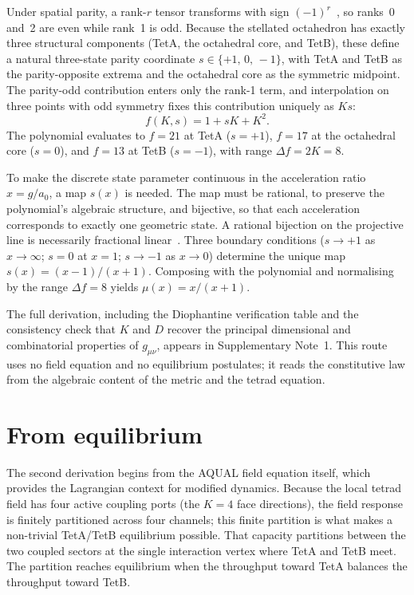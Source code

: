\documentclass[twocolumn]{iopjournal}
\begin{document}
Under spatial parity, a rank-$r$ tensor transforms with sign
$(-1)^r$~\cite{MTW}, so ranks~0 and~2 are even while rank~1
is odd. Because the stellated octahedron has exactly three
structural components (TetA, the octahedral core, and TetB),
these define a natural three-state parity coordinate
$s \in \{+1,\,0,\,-1\}$, with TetA and TetB as the
parity-opposite extrema and the octahedral core as the
symmetric midpoint. The parity-odd contribution enters only
the rank-1 term, and interpolation on three points with odd
symmetry fixes this contribution uniquely as $Ks$:
\begin{equation}
  f(K,s) = 1 + sK + K^2.
  \label{eq:poly_s}
\end{equation}
The polynomial evaluates to $f = 21$ at TetA ($s = +1$),
$f = 17$ at the octahedral core ($s = 0$), and $f = 13$ at
TetB ($s = -1$), with range $\Delta f = 2K = 8$.

To make the discrete state parameter continuous in the
acceleration ratio $x = g/a_0$, a map $s(x)$ is needed. The
map must be rational, to preserve the polynomial's algebraic
structure, and bijective, so that each acceleration corresponds
to exactly one geometric state. A rational bijection on the
projective line is necessarily fractional
linear~\cite{Hartshorne1977}. Three boundary conditions ($s
\to +1$ as $x \to \infty$; $s = 0$ at $x = 1$; $s \to -1$ as
$x \to 0$) determine the unique map $s(x) = (x-1)/(x+1)$.
Composing with the polynomial and normalising by the range
$\Delta f = 8$ yields $\mu(x) = x/(x+1)$.

The full derivation, including the Diophantine verification
table and the consistency check that $K$ and $D$ recover
the principal dimensional and combinatorial properties of
$g_{\mu\nu}$, appears in Supplementary Note~1. This route uses no field
equation and no equilibrium postulates; it reads the
constitutive law from the algebraic content of the metric
and the tetrad equation.


\section{From equilibrium}
\label{sec:route2}

The second derivation begins from the AQUAL field equation
itself, which provides the Lagrangian context for modified
dynamics. Because the local tetrad field has four active
coupling ports (the $K = 4$ face directions), the field
response is finitely partitioned across four channels; this
finite partition is what makes a non-trivial TetA/TetB
equilibrium possible.
That capacity partitions between the two coupled sectors at the single interaction
vertex where TetA and TetB meet. The partition reaches
equilibrium when the throughput toward TetA balances the
throughput toward TetB.
\end{document}
